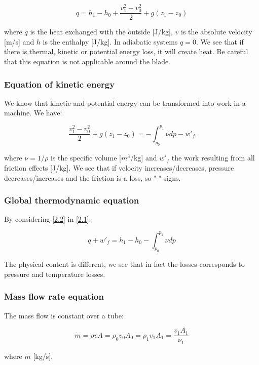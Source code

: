 \begin{equation}
q = h_1 - h_0 + \frac{v_1^2 - v_0^2}{2} + g(z_1-z_0)
\label{2.1}
\end{equation}

where $q$ is the heat exchanged with the outside [J/kg], $v$ is the absolute velocity [m/s] and $h$ is the enthalpy [J/kg]. In adiabatic systems $q=0$. We see that if there is thermal, kinetic or potential energy loss, it will create heat. Be careful that this equation is not applicable around the blade. 

\subsubsection{Equation of kinetic energy}
We know that kinetic and potential energy can be transformed into work in a machine. We have:

\begin{equation}
 \frac{v_1^2 - v_0^2}{2} + g(z_1-z_0) = - \int _{p_0}^{p_1} \nu dp - w'_f
 \label{2.2}
\end{equation}

where $\nu = 1/\rho$ is the specific volume [$m^3$/kg] and $w'_f$ the work resulting from all friction effects [J/kg]. We see that if velocity increases/decreases, pressure decreases/increases and the friction is a loss, so "-" signs. 

\subsubsection{Global thermodynamic equation}
By considering \eqref{2.2} in \eqref{2.1}: 

\begin{equation}
q + w'_f = h_1 - h_0  - \int _{p_0}^{p_1} \nu dp
\end{equation}

The physical content is different, we see that in fact the losses corresponds to pressure and temperature losses. 

\subsubsection{Mass flow rate equation}
The mass flow is constant over a tube: 

\begin{equation}
\dot{m} = \rho v A = \rho_0 v_0 A_0 = \rho_1 v_1 A_1 = \frac{v_1 A_1}{\nu _1}  
\end{equation}

where $\dot{m}$ [kg/s].

